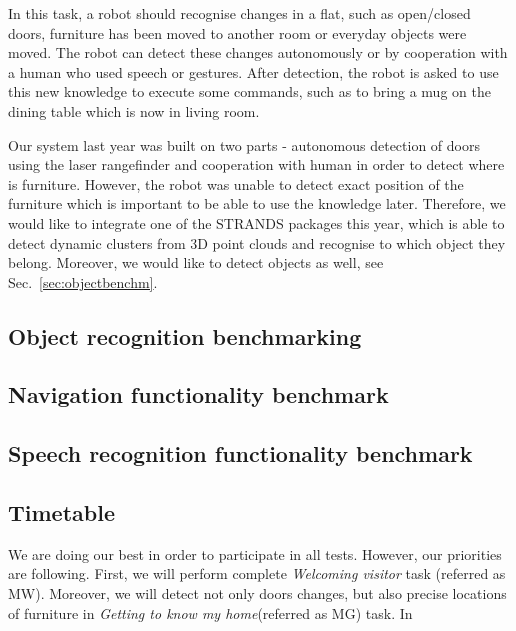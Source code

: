 In this task, a robot should recognise changes in a flat, such as open/closed doors, furniture has been moved to another room or everyday objects were moved. 
The robot can detect these changes autonomously or by cooperation with a human who used speech or gestures.
After detection, the robot is asked to use this new knowledge to execute some commands, such as to bring a mug on the dining table which is now in living room.

Our system last year was built on two parts - autonomous detection of doors using the laser rangefinder and cooperation with human in order to detect where is furniture. 
 However, the robot was unable to detect exact position of the furniture which is important to be able to use the knowledge later. 
Therefore, we would like to integrate one of the STRANDS packages this year, which is able to detect dynamic clusters from 3D point clouds and recognise to which object they belong. 
Moreover, we would like to detect objects as well, see Sec.~\ref{sec:objectbenchm}.

\subsection{Object recognition benchmarking} %

\subsection{Navigation functionality benchmark}

\subsection{Speech recognition functionality benchmark}

\subsection{Timetable}

We are doing our best in order to participate in all tests. However, our priorities are following.
First, we will perform complete \textit{Welcoming visitor} task (referred as MW). 
Moreover, we will detect not only doors changes, but also precise locations of furniture in \textit{Getting to know my home}(referred as MG) task. 
In \textit{}

